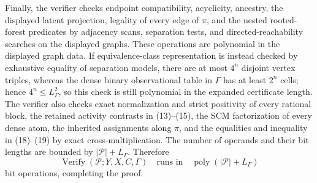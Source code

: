 Finally, the verifier checks endpoint compatibility, acyclicity, ancestry, the displayed latent projection, legality of every edge of \(\pi\), and the nested rooted-forest predicates by adjacency scans, separation tests, and directed-reachability searches on the displayed graphs.  These operations are polynomial in the displayed graph data.  If equivalence-class representation is instead checked by exhaustive equality of separation models, there are at most \(4^n\) disjoint vertex triples, whereas the dense binary observational table in \(\Gamma\) has at least \(2^n\) cells; hence \(4^n\le L_\Gamma^2\), so this check is still polynomial in the expanded certificate length.  The verifier also checks exact normalization and strict positivity of every rational block, the retained activity contrasts in (13)--(15), the SCM factorization of every dense atom, the inherited assignments along \(\pi\), and the equalities and inequality in (18)--(19) by exact cross-multiplication.  The number of operands and their bit lengths are bounded by \(|\mathcal P|+L_\Gamma\).  Therefore
\[
 \operatorname{Verify}(\mathcal P;Y,X,C,\Gamma)
 \quad\text{runs in}\quad
 \operatorname{poly}(|\mathcal P|+L_\Gamma)
\]
bit operations, completing the proof.
